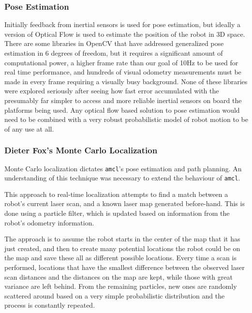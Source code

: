 \documentclass{article}[12]
\begin{document}
		\subsubsection{Pose Estimation}
	
		Initially feedback from inertial sensors is used for pose estimation, but ideally a version of Optical Flow is used to estimate the position of the robot in 3D space. There are some libraries in OpenCV that have addressed generalized pose estimation in 6 degrees of freedom, but it requires a significant amount of computational power, a higher frame rate than our goal of 10Hz to be used for real time performance, and hundreds of visual odometry measurements must be made in every frame requiring a visually busy background. None of these libraries were explored seriously after seeing how fast error accumulated with the presumably far simpler to access and more reliable inertial sensors on board the platforms being used. Any optical flow based solution to pose estimation would need to be combined with a very robust probabilistic model of robot motion to be of any use at all.
		
		\subsubsection{Dieter Fox's Monte Carlo Localization}
		
		Monte Carlo localization dictates \texttt{amcl}'s pose estimation and path planning.\cite{thrun2005probabilistic} An understanding of this technique was necessary to extend the behaviour of \texttt{amcl}.
		
		This approach to real-time localization attempts to find a match between a robot's current laser scan, and a known laser map generated before-hand. This is done using a particle filter, which is updated based on information from the robot's odometry information. 
		
		The approach is to assume the robot starts in the center of the map that it has just created, and then to create many potential locations the robot could be on the map and save these all as different possible locations. Every time a scan is performed, locations that have the smallest difference between the observed laser scan distances and the distances on the map are kept, while those with great variance are left behind. From the remaining particles, new ones are randomly scattered around based on a very simple probabilistic distribution and the process is constantly repeated. 
		
\end{document}
